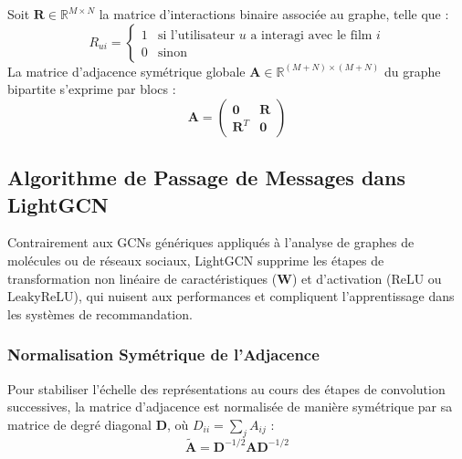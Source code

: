 \documentclass[12pt,a4paper]{article}
\begin{document}
Soit $\mathbf{R} \in \mathbb{R}^{M \times N}$ la matrice d'interactions binaire associée au graphe, telle que :
\begin{equation}
    R_{ui} = \begin{cases} 
        1 & \text{si l'utilisateur } u \text{ a interagi avec le film } i \\ 
        0 & \text{sinon} 
    \end{cases}
\end{equation}
La matrice d'adjacence symétrique globale $\mathbf{A} \in \mathbb{R}^{(M+N) \times (M+N)}$ du graphe bipartite s'exprime par blocs :
\begin{equation}
    \mathbf{A} = \begin{pmatrix}
        \mathbf{0} & \mathbf{R} \\
        \mathbf{R}^T & \mathbf{0}
    \end{pmatrix}
\end{equation}

\subsection{Algorithme de Passage de Messages dans LightGCN}
Contrairement aux GCNs génériques appliqués à l'analyse de graphes de molécules ou de réseaux sociaux, LightGCN supprime les étapes de transformation non linéaire de caractéristiques ($\mathbf{W}$) et d'activation ($\text{ReLU}$ ou $\text{LeakyReLU}$), qui nuisent aux performances et compliquent l'apprentissage dans les systèmes de recommandation.

\subsubsection{Normalisation Symétrique de l'Adjacence}
Pour stabiliser l'échelle des représentations au cours des étapes de convolution successives, la matrice d'adjacence est normalisée de manière symétrique par sa matrice de degré diagonal $\mathbf{D}$, où $D_{ii} = \sum_{j} A_{ij}$ :
\begin{equation}
    \tilde{\mathbf{A}} = \mathbf{D}^{-1/2} \mathbf{A} \mathbf{D}^{-1/2}
\end{equation}
\end{document}
